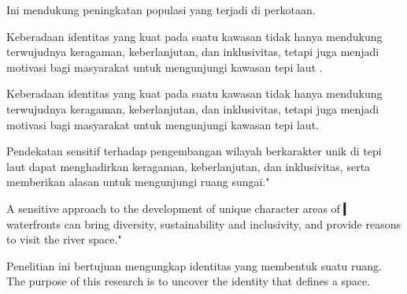 \documentclass[../riset_senja.tex]{subfiles}
\begin{document}
Ini mendukung peningkatan populasi yang terjadi di perkotaan.




Keberadaan identitas yang kuat pada suatu kawasan tidak hanya mendukung terwujudnya keragaman, keberlanjutan, dan inklusivitas, tetapi juga menjadi motivasi bagi masyarakat untuk mengunjungi kawasan tepi laut \citep{petrtylova2022}.

Keberadaan identitas yang kuat pada suatu kawasan tidak hanya mendukung terwujudnya keragaman, keberlanjutan, dan inklusivitas, tetapi juga menjadi motivasi bagi masyarakat untuk mengunjungi kawasan tepi laut.

Pendekatan sensitif terhadap pengembangan wilayah berkarakter unik di tepi laut dapat menghadirkan keragaman, keberlanjutan, dan inklusivitas, serta memberikan alasan untuk mengunjungi ruang sungai."

A sensitive approach to the development of unique character areas of ▎ waterfronts can bring diversity, sustainability and inclusivity, and provide reasons to visit the river space."


Penelitian ini bertujuan mengungkap identitas yang membentuk suatu ruang.
The purpose of this research is to uncover the identity that defines a space.



\end{document}
